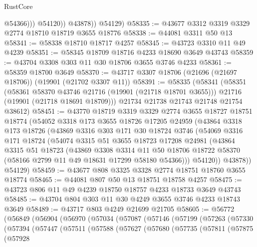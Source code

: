 \begin{lexlean}{RustCore}
\begin{coremodule}
                    @54366)))
              @54120))
          @43878))
      @54129)
@58335 := @43677 @3312 @3319 @3329 @2774 @18710 @18719 @3655 @18776
@58338 := @44081 @3311 @50 @13
@58341 := @58338 @18710 @18717 @4257
@58345 := @43723 @3310 @11 @49 @4239
@58351 := @58345 @18709 @18716 @4233 @18690 @3649 @43743
@58359 := @43704 @3308 @303 @11 @30 @18706 @3655 @3746 @4233
@58361 := @58359 @18700 @3649
@58370 := @43717 @3307 @18706 (@21696 (@21697 @18706)) (@19901 (@21702 @3307 @11))
@58391 := @58335
    (@58341
      (@58351
        (@58361 @58370 @43746 @21716 (@19901 (@21718 @18701 @3655)))
        @21716
        (@19901 (@21718 @18691 @18709)))
      @21734
      @21738
      @21743
      @21748
      @21754
      @38612)
@58451 := @43770
    @18719
    @3319
    @3329
    @2774
    @3655
    @18727
    @18751
    @18774
    (@54052
      @3318
      @173
      @3655
      @18726
      @17205
      @24959
      (@43864
        @3318
        @173
        @18726
        (@43869
          @3316
          @303
          @171
          @30
          @18724
          @3746
          (@54069
            @3316
            @171
            @18724
            (@54074
              @3315
              @51
              @3655
              @18723
              @17208
              @24981
              (@43864
                @3315
                @51
                @18723
                (@43869
                  @3308
                  @3314
                  @11
                  @50
                  @18706
                  @18722
                  @58370
                  (@58166 @2799 @11 @49 @18631 @17299 @58180 @54366)))
              @54120))
          @43878))
      @54129)
@58459 := @43677 @808 @3325 @3328 @2774 @18751 @18760 @3655 @18774
@58465 := @44081 @807 @50 @13 @18751 @18758 @4257
@58475 := @43723 @806 @11 @49 @4239 @18750 @18757 @4233 @18733 @3649 @43743
@58485 := @43704 @804 @303 @11 @30 @4249 @3655 @3746 @4233 @18743 @3649
@58489 := @43717 @803 @4249 @21699 @21705
@58605 := @56772
    (@56849
      (@56904
        (@56970
          (@57034
            (@57087
              (@57146
                (@57199
                  (@57263
                    (@57330
                      (@57394
                        (@57447
                          (@57511
                            (@57588
                              (@57627
                                (@57680
                                  (@57735
                                    (@57811
                                      (@57875
                                        (@57928

\end{coremodule}
\end{lexlean}
